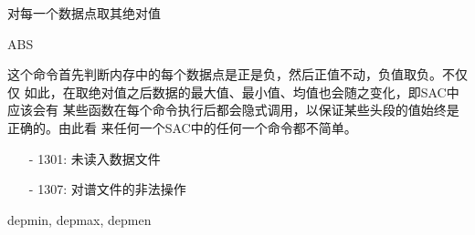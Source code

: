 \label{cmd:abs}

对每一个数据点取其绝对值

\begin{SACSTX}
ABS
\end{SACSTX}

这个命令首先判断内存中的每个数据点是正是负，然后正值不动，负值取负。不仅仅
如此，在取绝对值之后数据的最大值、最小值、均值也会随之变化，即SAC中应该会有
某些函数在每个命令执行后都会隐式调用，以保证某些头段的值始终是正确的。由此看
来任何一个SAC中的任何一个命令都不简单。

\begin{itemize}
\item[-]1301: 未读入数据文件
\item[-]1307: 对谱文件的非法操作
\end{itemize}

depmin, depmax, depmen
